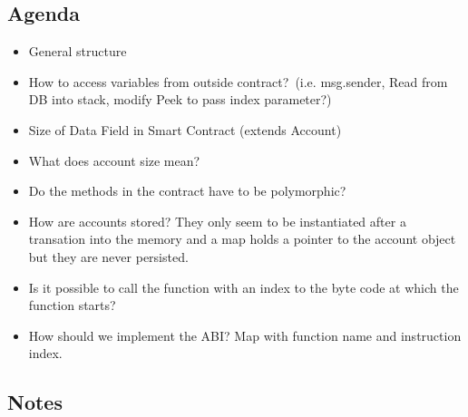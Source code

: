 \subsection{Agenda}

\begin{itemize}
\item
  General structure
\item
  How to access variables from outside contract?~(i.e. msg.sender, Read
  from DB into stack, modify Peek to pass index parameter?)
\item
  Size of Data Field in Smart Contract (extends Account)
\item
  What does account size mean?
\item
  Do the methods in the contract have to be polymorphic?
\item
  How are accounts stored? They only seem to be instantiated after a
  transation into the memory and a map holds a pointer to the account
  object but they are never persisted.
\item
  Is it possible to call the function with an index to the byte code at
  which the function starts?
\item
  How should we implement the ABI? Map with function name and
  instruction index.
\end{itemize}

\subsection{Notes}

